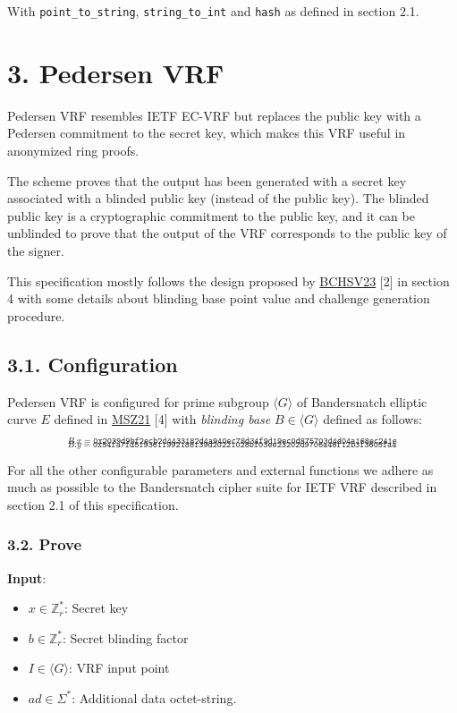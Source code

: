 \documentclass[
]{article}
\providecommand{\tightlist}{%
  \setlength{\itemsep}{0pt}\setlength{\parskip}{0pt}}
\begin{document}
With \texttt{point\_to\_string}, \texttt{string\_to\_int} and
\texttt{hash} as defined in section 2.1.

\hypertarget{pedersen-vrf}{%
\section{3. Pedersen VRF}\label{pedersen-vrf}}

Pedersen VRF resembles IETF EC-VRF but replaces the public key with a
Pedersen commitment to the secret key, which makes this VRF useful in
anonymized ring proofs.

The scheme proves that the output has been generated with a secret key
associated with a blinded public key (instead of the public key). The
blinded public key is a cryptographic commitment to the public key, and
it can be unblinded to prove that the output of the VRF corresponds to
the public key of the signer.

This specification mostly follows the design proposed by
\href{https://eprint.iacr.org/2023/002}{BCHSV23} {[}2{]} in section 4
with some details about blinding base point value and challenge
generation procedure.

\hypertarget{configuration-1}{%
\subsection{3.1. Configuration}\label{configuration-1}}

Pedersen VRF is configured for prime subgroup \(\langle G \rangle\) of
Bandersnatch elliptic curve \(E\) defined in
\href{https://eprint.iacr.org/2021/1152}{MSZ21} {[}4{]} with
\emph{blinding base} \(B \in \langle G \rangle\) defined as follows:

\[_{B.x = \texttt{0x2039d9bf2ecb2d4433182d4a940ec78d34f9d19ec0d875703d4d04a168ec241e}}\]
\[_{B.y = \texttt{0x54fa7fd5193611992188139d20221028bf03ee23202d9706a46f12b3f3605faa}}\]

For all the other configurable parameters and external functions we
adhere as much as possible to the Bandersnatch cipher suite for IETF VRF
described in section 2.1 of this specification.

\hypertarget{prove-1}{%
\subsubsection{3.2. Prove}\label{prove-1}}

\textbf{Input}:

\begin{itemize}
\tightlist
\item
  \(x \in \mathbb{Z}^*_r\): Secret key
\item
  \(b \in \mathbb{Z}^*_r\): Secret blinding factor
\item
  \(I \in \langle G \rangle\): VRF input point
\item
  \(ad \in \Sigma^*\): Additional data octet-string.
\end{itemize}
\end{document}
